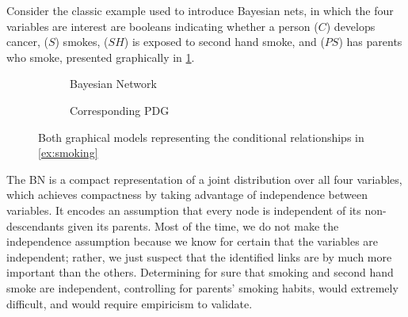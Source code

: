 \documentclass{article}
\newcommand{\MN}{PDG}
\begin{document}
	

	\begin{example}\label{ex:smoking}
		Consider the classic example used to introduce Bayesian nets, in which the four variables are interest are booleans indicating whether a person ($C$) develops cancer, ($S$) smokes, ($SH$) is exposed to second hand smoke, and ($PS$) has parents who smoke, presented graphically in \cref{subfig:smoking-bn}.
		\begin{figure}[ht!]
			\centering
			
			\begin{subfigure}[b]{0.3\textwidth}
				\caption{Bayesian Network}
				\label{subfig:smoking-bn}
			\end{subfigure}%
			\hspace{2em}\vline\hspace{2em}
			\begin{subfigure}[b]{0.5\textwidth}
				\caption{Corresponding \MN}
				\label{subfig:smoking-pdg}
			\end{subfigure}
		
			\caption{Both graphical models representing the conditional relationships in \cref{ex:smoking}}
			\label{fig:smoking-bn+pdg}
		\end{figure}
		
		The BN is a compact representation of a joint distribution over all four variables, which achieves compactness by taking advantage of independence between variables. It encodes an assumption that every node is independent of its non-descendants given its parents.
		Most of the time, we do not make the independence assumption because we know for certain that the variables are independent; rather, we just suspect that the identified links are by much more important than the others. Determining for sure that smoking  and second hand smoke are independent, controlling for parents' smoking habits, would extremely difficult, and would require empiricism to validate.
		

\end{example}
\end{document}
